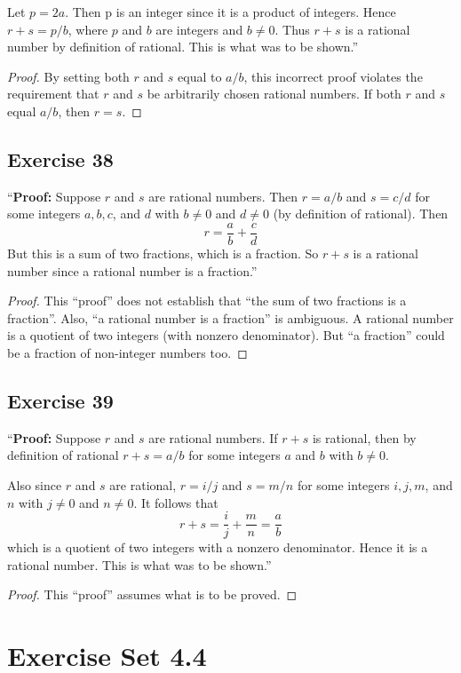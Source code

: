 \documentclass[14pt]{extarticle}
\begin{document}
Let $p = 2a$. Then p is an integer since it is a product of integers. Hence $r + s = p/b$, where $p$ and $b$ are integers and $b \neq 0$. Thus $r + s$ is a rational number by definition of rational. This is what was to be shown.”

\begin{proof}
    By setting both $r$ and $s$ equal to $a/b$, this incorrect proof violates the requirement that $r$ and $s$ be arbitrarily chosen rational numbers. If both $r$ and $s$ equal $a/b$, then $r=s$.
\end{proof}

\subsection{Exercise 38}
“{\bf Proof:} Suppose $r$ and $s$ are rational numbers. Then $r = a/b$ and $s = c/d$ for some integers $a, b, c$, and $d$ with $b \neq 0$ and $d \neq 0$ (by definition of rational). Then
\[
    r = \frac{a}{b}+\frac{c}{d}
\]
But this is a sum of two fractions, which is a fraction. So $r + s$ is a rational number since a rational number is a fraction.”

\begin{proof}
    This ``proof'' does not establish that ``the sum of two fractions is a fraction''. Also, ``a rational number is a fraction'' is ambiguous. A rational number is a quotient of two integers (with nonzero denominator). But ``a fraction'' could be a fraction of non-integer numbers too.
\end{proof}

\subsection{Exercise 39}
“{\bf Proof:} Suppose $r$ and $s$ are rational numbers. If $r + s$ is rational, then by definition of rational $r + s = a/b$ for some integers $a$ and $b$ with $b \neq 0$.

Also since $r$ and $s$ are rational, $r = i/j$ and $s = m/n$ for some integers $i, j, m$, and $n$ with $j \neq 0$ and $n \neq 0$. It follows that
\[
    r+s = \frac{i}{j} + \frac{m}{n} = \frac{a}{b}
\]
which is a quotient of two integers with a nonzero denominator. Hence it is a rational number. This is what was to be shown.”

\begin{proof}
    This ``proof'' assumes what is to be proved.
\end{proof}

\section{Exercise Set 4.4}
\end{document}
